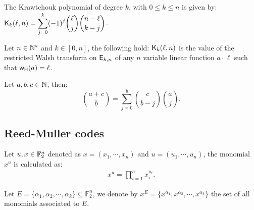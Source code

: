 \documentclass[11pt]{llncs}
\begin{document}
\begin{definition}\label{def:Kraw}
	The Krawtchouk polynomial of degree $k$, with $0\leq k\leq n$ is given by: $ \displaystyle \mathsf{K}_{k}(\ell,n)=\sum_{j=0}^{k} (-1)^j \binom{\ell}{j} \binom{n-\ell}{k-j}$. 
\end{definition}


\begin{Prop}\label{prop:Kr}
	Let $n\in \mathbb{N}^*$ and $k\in [0,n]$, the following hold:
 $\mathsf{K}_{k}(\ell,n)$ is the value of the restricted Walsh transform on $\mathsf{E}_{k,n}$ of any $n$ variable linear function $a\cdot \ell$ such that $\mathsf{w_H}(a)=\ell$.
\end{Prop}


\begin{Prop}\label{prop:Vandermonde}
	Let $a,b,c \in \mathbb{N}$, then:
	\begin{equation*}
	\binom{a+c}{b}=\sum_{j=0}^b\binom{c}{b-j}  \binom{a}{j}.
	\end{equation*}
\end{Prop}



\fi


\subsection{Reed-Muller codes}

\begin{definition}
    Let $u, x\in \mathbb{F}_2^n$ denoted as $x=(x_1,\cdots,x_n)$ and $u=(u_1,\cdots,u_n)$, the monomial $x^{u}$ is calculated as:
    \begin{align*}
        x^{u} = \prod_{i=1}^n x_i^{u_i}.
    \end{align*}
    
    Let $E = \{\alpha_1, \alpha_2, \cdots, \alpha_k\} \subseteq \mathbb{F}_2^n$, we denote by $x^E = \{x^{\alpha_1}, x^{\alpha_2}, \cdots, x^{\alpha_k}\}$ the set of all monomials associated to $E$.
\end{definition}
\end{document}
